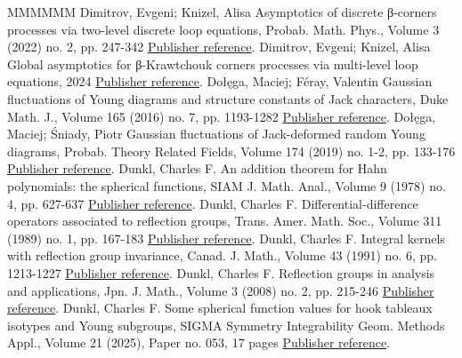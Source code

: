 \documentclass[11pt]{article}
\theoremstyle{definition}
\numberwithin{equation}{section}
\begin{document}
\begin{thebibliography}{MMMMMM}
 Dimitrov, Evgeni; Knizel, Alisa Asymptotics of discrete β-corners processes via two-level discrete loop equations, Probab. Math. Phys., Volume 3 (2022) no. 2, pp. 247-342 \href{https://alco.centre-mersenne.org/articles/10.5802/alco.451/#dimitrov2022asymptotics}{Publisher reference}.
 Dimitrov, Evgeni; Knizel, Alisa Global asymptotics for β-Krawtchouk corners processes via multi-level loop equations, 2024 \href{https://alco.centre-mersenne.org/articles/10.5802/alco.451/#dimitrov2024global}{Publisher reference}.
 Dołęga, Maciej; Féray, Valentin Gaussian fluctuations of Young diagrams and structure constants of Jack characters, Duke Math. J., Volume 165 (2016) no. 7, pp. 1193-1282 \href{https://alco.centre-mersenne.org/articles/10.5802/alco.451/#dolega2016gaussian}{Publisher reference}.
 Dołęga, Maciej; Śniady, Piotr Gaussian fluctuations of Jack-deformed random Young diagrams, Probab. Theory Related Fields, Volume 174 (2019) no. 1-2, pp. 133-176 \href{https://alco.centre-mersenne.org/articles/10.5802/alco.451/#dolega2019gaussian}{Publisher reference}.
 Dunkl, Charles F. An addition theorem for Hahn polynomials: the spherical functions, SIAM J. Math. Anal., Volume 9 (1978) no. 4, pp. 627-637 \href{https://alco.centre-mersenne.org/articles/10.5802/alco.451/#dunkl1978addition}{Publisher reference}.
 Dunkl, Charles F. Differential-difference operators associated to reflection groups, Trans. Amer. Math. Soc., Volume 311 (1989) no. 1, pp. 167-183 \href{https://alco.centre-mersenne.org/articles/10.5802/alco.451/#dunkl1989differential}{Publisher reference}.
 Dunkl, Charles F. Integral kernels with reflection group invariance, Canad. J. Math., Volume 43 (1991) no. 6, pp. 1213-1227 \href{https://alco.centre-mersenne.org/articles/10.5802/alco.451/#dunkl1991integral}{Publisher reference}.
 Dunkl, Charles F. Reflection groups in analysis and applications, Jpn. J. Math., Volume 3 (2008) no. 2, pp. 215-246 \href{https://alco.centre-mersenne.org/articles/10.5802/alco.451/#dunkl2008reflection}{Publisher reference}.
 Dunkl, Charles F. Some spherical function values for hook tableaux isotypes and Young subgroups, SIGMA Symmetry Integrability Geom. Methods Appl., Volume 21 (2025), Paper no. 053, 17 pages \href{https://alco.centre-mersenne.org/articles/10.5802/alco.451/#Dun25a}{Publisher reference}.

\end{thebibliography}
\end{document}
